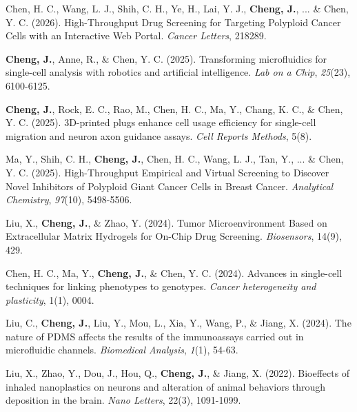 \documentclass[a4paper,10pt]{article}
\begin{document}
\begin{enumerate}[label={[\arabic*]}, leftmargin=*, labelsep=0.45em,
                  topsep=2pt, itemsep=1.4pt, parsep=0pt]

  \item Chen, H. C., Wang, L. J., Shih, C. H., Ye, H., Lai, Y. J.,
        \textbf{Cheng, J.}, ... \& Chen, Y. C. (2026). High-Throughput Drug
        Screening for Targeting Polyploid Cancer Cells with an Interactive Web
        Portal. \textit{Cancer Letters}, 218289.

  \item \textbf{Cheng, J.}, Anne, R., \& Chen, Y. C. (2025). Transforming
        microfluidics for single-cell analysis with robotics and artificial
        intelligence. \textit{Lab on a Chip}, \textit{25}(23), 6100-6125.

  \item \textbf{Cheng, J.}, Rock, E. C., Rao, M., Chen, H. C., Ma, Y.,
        Chang, K. C., \& Chen, Y. C. (2025). 3D-printed plugs enhance cell usage
        efficiency for single-cell migration and neuron axon guidance assays.
        \textit{Cell Reports Methods}, 5(8).

  \item Ma, Y., Shih, C. H., \textbf{Cheng, J.}, Chen, H. C., Wang, L. J.,
        Tan, Y., ... \& Chen, Y. C. (2025). High-Throughput Empirical and Virtual
        Screening to Discover Novel Inhibitors of Polyploid Giant Cancer Cells in
        Breast Cancer. \textit{Analytical Chemistry}, \textit{97}(10), 5498-5506.

  \item Liu, X., \textbf{Cheng, J.}, \& Zhao, Y. (2024). Tumor Microenvironment
        Based on Extracellular Matrix Hydrogels for On-Chip Drug Screening.
        \textit{Biosensors}, 14(9), 429.

  \item Chen, H. C., Ma, Y., \textbf{Cheng, J.}, \& Chen, Y. C. (2024). Advances
        in single-cell techniques for linking phenotypes to genotypes.
        \textit{Cancer heterogeneity and plasticity}, 1(1), 0004.

  \item Liu, C., \textbf{Cheng, J.}, Liu, Y., Mou, L., Xia, Y., Wang, P., \&
        Jiang, X. (2024). The nature of PDMS affects the results of the
        immunoassays carried out in microfluidic channels.
        \textit{Biomedical Analysis}, \textit{1}(1), 54-63.

  \item Liu, X., Zhao, Y., Dou, J., Hou, Q., \textbf{Cheng, J.}, \& Jiang, X.
        (2022). Bioeffects of inhaled nanoplastics on neurons and alteration of
        animal behaviors through deposition in the brain. \textit{Nano Letters},
        22(3), 1091-1099.

\end{enumerate}
\end{document}
